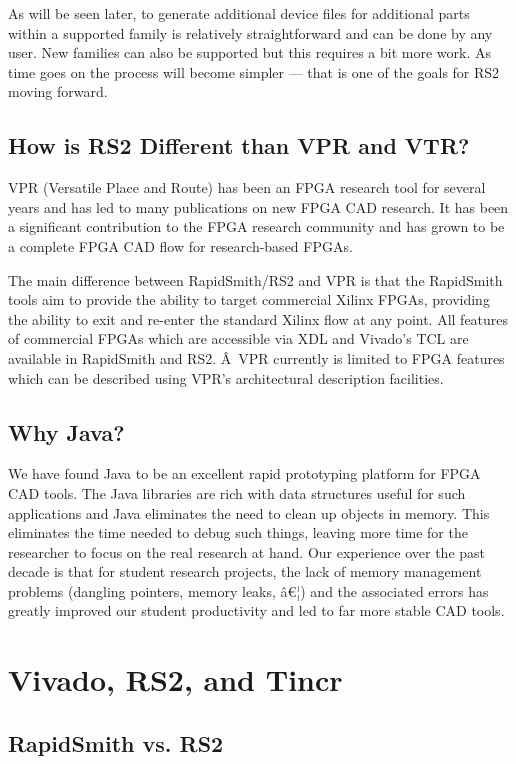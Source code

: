 \documentclass[12pt]{article}
\begin{document}
As will be seen later, to generate additional device files for additional parts
within a supported family is relatively straightforward and can be done by any
user.  New families can also be supported but this
requires a bit more work.  As time goes on the process will become simpler ---
that is one of the goals for RS2 moving forward.

\subsection{How is RS2 Different than VPR and VTR?}
VPR (Versatile Place and Route) has been an FPGA research tool for several years
and has led to many publications on new FPGA CAD research.  It has been a
significant contribution to the FPGA research community and has grown to be a
complete FPGA CAD flow for research-based FPGAs.

The main difference between RapidSmith/RS2 and VPR is that the RapidSmith tools
aim to provide the ability to target commercial Xilinx FPGAs, providing the
ability to exit and re-enter the standard Xilinx flow at any point.  All
features of commercial FPGAs which are accessible via XDL and Vivado's TCL are available
in RapidSmith and RS2. Â VPR currently is limited to FPGA features which can be
described using VPR's architectural description facilities.

\subsection{Why Java?}
We have found Java to be an excellent rapid prototyping platform for FPGA CAD
tools.  The Java libraries are rich with data structures useful for such
applications and Java eliminates the need to clean up objects in memory.  This
eliminates the time needed to debug such things, leaving more time for the
researcher to focus on the real research at hand.  Our experience over the past
decade is that for student research projects, the lack of memory management
problems (dangling pointers, memory leaks, â€¦) and the associated errors has
greatly improved our student productivity and led to far more stable CAD tools.


\section{Vivado, RS2, and Tincr}
\subsection{RapidSmith vs. RS2}
\end{document}
